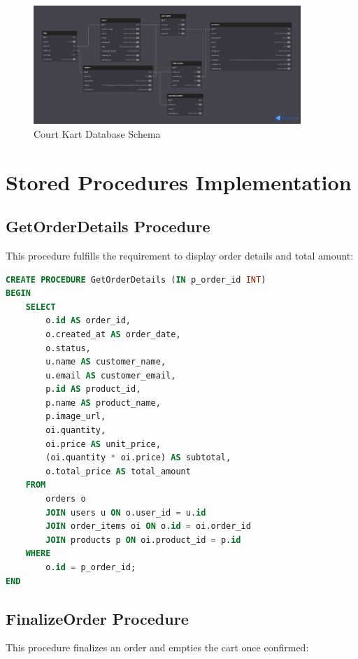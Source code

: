 \documentclass[14pt,a4paper]{article}
\begin{document}
\begin{figure}[H]
    \centering
    \includegraphics[width=0.9\textwidth]{../public/assets/images/db-schema.png}
    \caption{Court Kart Database Schema}
\end{figure}

\section{Stored Procedures Implementation}

\subsection{GetOrderDetails Procedure}
This procedure fulfills the requirement to display order details and total amount:

\begin{lstlisting}[language=SQL]
CREATE PROCEDURE GetOrderDetails (IN p_order_id INT)
BEGIN
    SELECT
        o.id AS order_id,
        o.created_at AS order_date,
        o.status,
        u.name AS customer_name,
        u.email AS customer_email,
        p.id AS product_id,
        p.name AS product_name,
        p.image_url,
        oi.quantity,
        oi.price AS unit_price,
        (oi.quantity * oi.price) AS subtotal,
        o.total_price AS total_amount
    FROM
        orders o
        JOIN users u ON o.user_id = u.id
        JOIN order_items oi ON o.id = oi.order_id
        JOIN products p ON oi.product_id = p.id
    WHERE
        o.id = p_order_id;
END
\end{lstlisting}

\subsection{FinalizeOrder Procedure}
This procedure finalizes an order and empties the cart once confirmed:
\end{document}
